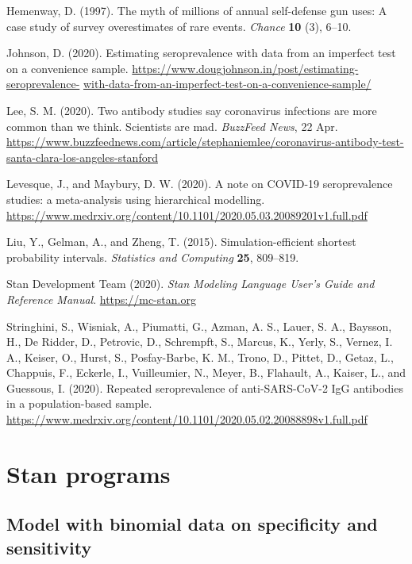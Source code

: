 \documentclass[11pt]{article}
\begin{document}
\bibitem Hemenway, D. (1997).  The myth of millions of annual
  self-defense gun uses: A case study of survey overestimates of rare
  events.  {\em Chance} {\bf 10} (3), 6--10.

\bibitem Johnson, D. (2020).  Estimating seroprevalence with data from
  an imperfect test on a convenience sample.  {\small
    \url{https://www.dougjohnson.in/post/estimating-seroprevalence-}} {\small \url{with-data-from-an-imperfect-test-on-a-convenience-sample/}}

\bibitem Lee, S. M. (2020).  Two antibody studies say coronavirus
  infections are more common than we think. Scientists are mad.  {\em
    BuzzFeed News}, 22 Apr.  {\small
    \url{https://www.buzzfeednews.com/article/stephaniemlee/coronavirus-antibody-test-santa-clara-los-angeles-stanford}}

\bibitem Levesque, J., and Maybury, D. W. (2020).  A note on COVID-19
  seroprevalence studies: a meta-analysis using hierarchical
  modelling.  {\small
    \url{https://www.medrxiv.org/content/10.1101/2020.05.03.20089201v1.full.pdf}}

\bibitem Liu, Y., Gelman, A., and Zheng, T. (2015).
  Simulation-efficient shortest probability intervals. {\em Statistics
    and Computing} {\bf 25}, 809--819.

\bibitem Stan Development Team (2020). {\em Stan Modeling Language
    User's Guide and Reference Manual}.  {\small
    \url{https://mc-stan.org}}

\bibitem Stringhini, S., Wisniak, A., Piumatti, G., Azman, A. S.,
  Lauer, S. A., Baysson, H., De Ridder, D., Petrovic, D., Schrempft,
  S., Marcus, K., Yerly, S., Vernez, I. A., Keiser, O., Hurst, S.,
  Posfay-Barbe, K. M., Trono, D., Pittet, D., Getaz, L., Chappuis, F.,
  Eckerle, I., Vuilleumier, N., Meyer, B., Flahault, A., Kaiser, L.,
  and Guessous, I. (2020).  Repeated seroprevalence of anti-SARS-CoV-2
  IgG antibodies in a population-based sample.  {\small
    \url{https://www.medrxiv.org/content/10.1101/2020.05.02.20088898v1.full.pdf}}

\pagebreak
\appendix

\section{Stan programs}

\subsection{Model with binomial data on specificity and sensitivity}\label{stan2}
\end{document}

